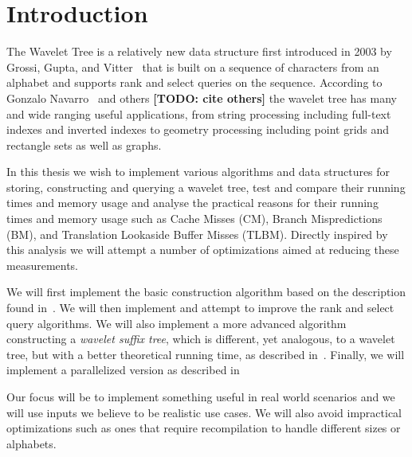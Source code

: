 \section{Introduction}
The Wavelet Tree is a relatively new data structure first introduced in 2003 by Grossi, Gupta, and Vitter~\cite{Grossi:2003:HET:644108.644250} that is built on a sequence of characters from an alphabet and supports rank and select queries on the sequence.
According to Gonzalo Navarro~\cite{Navjda13} and others \textbf{[TODO: cite others]} the wavelet tree has many and wide ranging useful applications, from string processing including full-text indexes and inverted indexes to geometry processing including point grids and rectangle sets as well as graphs.

In this thesis we wish to implement various algorithms and data structures for storing, constructing and querying a wavelet tree, test and compare their running times and memory usage and analyse the practical reasons for their running times and memory usage such as Cache Misses (CM), Branch Mispredictions (BM), and Translation Lookaside Buffer Misses (TLBM). Directly inspired by this analysis we will attempt a number of optimizations aimed at reducing these measurements.

We will first implement the basic construction algorithm based on the description found in~\citep{ Navjda13}.
We will then implement and attempt to improve the rank and select query algorithms.
We will also implement a more advanced algorithm constructing a \textit{wavelet suffix tree}, which is different, yet analogous, to a wavelet tree, but with a better theoretical running time, as described in~\citep{DBLP:journals/corr/BabenkoGKS14}. Finally, we will implement a parallelized version as described in~\citep{DBLP:journals/corr/Shun14}

Our focus will be to implement something useful in real world scenarios and we will use inputs we believe to be realistic use cases.
We will also avoid impractical optimizations such as ones that require recompilation to handle different sizes or alphabets.